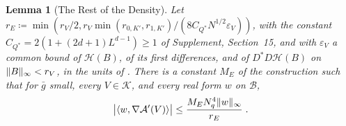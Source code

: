 \documentclass[11pt]{preprint}
\DeclarePairedDelimiter{\norm}{\lVert}{\rVert}
\numberwithin{equation}{section}
\newtheorem{lemma}[theorem]{Lemma}
\theoremstyle{definition}
\theoremstyle{remark}
\theoremstyle{plain}
\begin{document}
\begin{lemma}[The Rest of the Density]\label{lem:density-rest}
Let $r_E \coloneqq \min(r_V/2, r_V\min(r_{0,K'}, r_{1,K'})/(8C_{Q^*}N^{1/2}\varepsilon_V))$, with the constant $C_{Q^*} = 2(1 + (2d + 1)L^{d-1}) \geq 1$ of Supplement, Section~15, and with $\varepsilon_V$ a common bound of $\mathcal H(B)$, of its first differences, and of $D^*D\mathcal H(B)$ on $\norm B_\infty < r_V$, in the units of \cite[(19), p.~281]{BalabanVAR}. There is a constant $M_E$ of the construction such that for $\bar g$ small, every $V \in \mathcal K$, and every real form $w$ on $\mathcal B$,
\begin{equation}\label{eq:density-rest}
    \bigl\lvert\langle w, \nabla\mathcal A'(V)\rangle\bigr\rvert \leq \frac{M_EN_q^4\norm w_\infty}{r_E}\;.
\end{equation}
\end{lemma}
\end{document}
